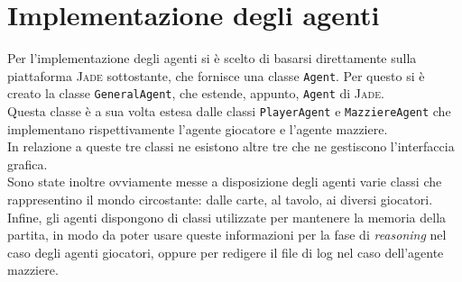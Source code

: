 \chapter*{Implementazione degli agenti}
\graphicspath{{Chapter5/Chapter5Figs/PNG/}{Chapter5/Chapter5Figs/PDF/}{Chapter5/Chapter5Figs/}}



Per l'implementazione degli agenti si è scelto di basarsi direttamente sulla piattaforma \textsc{Jade} sottostante, che fornisce una classe \texttt{Agent}.
Per questo si è creato la classe \texttt{GeneralAgent}, che estende, appunto, \texttt{Agent} di \textsc{Jade}.\\
Questa classe è a sua volta estesa dalle classi \texttt{PlayerAgent} e \texttt{MazziereAgent} che implementano rispettivamente l'agente giocatore e l'agente mazziere.\\
In relazione a queste tre classi ne esistono altre tre che ne gestiscono l'interfaccia grafica.\\
Sono state inoltre ovviamente messe a disposizione degli agenti varie classi che rappresentino il mondo circostante: dalle carte, al tavolo, ai diversi giocatori.\\
Infine, gli agenti dispongono di classi utilizzate per mantenere la memoria della partita, in modo da poter usare queste informazioni per la fase di \emph{reasoning} nel caso degli agenti giocatori, oppure per redigere il file di log nel caso dell'agente mazziere.
